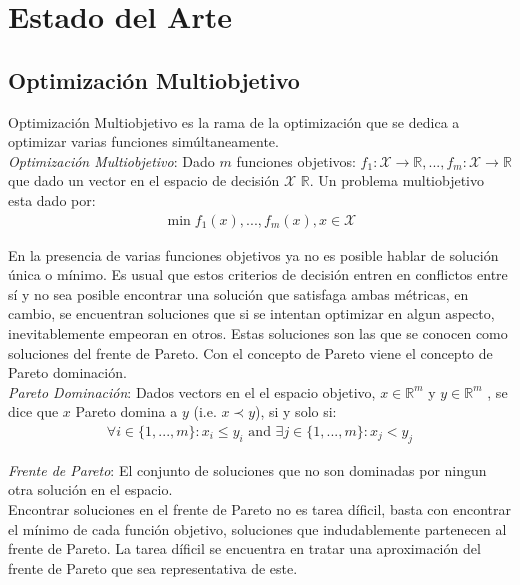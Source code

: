 \chapter{Estado del Arte}\label{chapter:state-of-the-art}

\section{Optimizaci\'on Multiobjetivo}

Optimizaci\'on Multiobjetivo es la rama de la optimizaci\'on que se dedica a optimizar varias funciones sim\'ultaneamente.\\

\textit{Optimizaci\'on Multiobjetivo}: Dado $m$ funciones objetivos: $f_1: \mathcal{X} \rightarrow \mathbb{R}, ..., f_m: \mathcal{X} \rightarrow \mathbb{R}$ que dado un vector en el espacio de decisi\'on $\mathcal{X}$  $\mathbb{R}$. Un problema multiobjetivo esta dado por:
\begin{align*}
    \min f_1(x), ..., f_m(x), x \in \mathcal{X}
\end{align*}

En la presencia de varias funciones objetivos ya no es posible hablar de soluci\'on \'unica o m\'inimo. Es usual que estos criterios de decisi\'on entren en conflictos entre s\'i y no sea posible encontrar una soluci\'on que satisfaga ambas m\'etricas, en cambio, se encuentran soluciones que si se intentan optimizar en algun aspecto, inevitablemente empeoran en otros. Estas soluciones son las que se conocen como soluciones del frente de Pareto. Con el concepto de Pareto viene el concepto de Pareto dominaci\'on.\\

\textit{Pareto Dominaci\'on}: Dados vectors en el el espacio objetivo, $x \in \mathbb{R}^m$ y $y \in \mathbb{R}^m$ , se dice que $x$ Pareto domina a $y$ (i.e. $x \prec y$), si y solo si:
\begin{align*}
    \forall i \in \{1, ..., m\}: x_i \leq y_i \text{ and } \exists j \in \{1, ..., m\}: x_j < y_j 
\end{align*}

\textit{Frente de Pareto}: El conjunto de soluciones que no son dominadas por ningun otra soluci\'on en el espacio.\\

Encontrar soluciones en el frente de Pareto no es tarea d\'ificil, basta con encontrar el m\'inimo de cada funci\'on objetivo, soluciones que indudablemente partenecen al frente de Pareto. La tarea d\'ificil se encuentra en tratar una aproximaci\'on del frente de Pareto que sea representativa de este.

